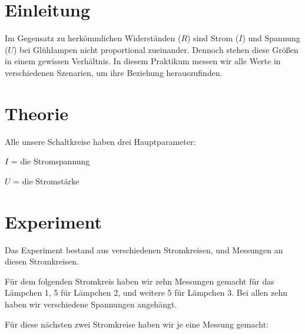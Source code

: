 \documentclass[12pt, a4paper, twoside]{article}
\begin{document}
\maketitlepage

\section{Einleitung}
Im Gegensatz zu herkömmlichen Widerständen ($R$) sind Strom ($I$) und Spannung ($U$) bei Glühlampen nicht proportional zueinander. Dennoch stehen diese Größen in einem gewissen Verhältnis.
In diesem Praktikum messen wir alle Werte in verschiedenen Szenarien, um ihre Beziehung herauszufinden.


\section{Theorie}
Alle unsere Schaltkreise haben drei Hauptparameter:
\begin{list}{-}{}
  \item $I$ = die Stromspannung
  \item $U$ = die Stromstärke
\end{list}

\section{Experiment}
Das Experiment bestand aus verschiedenen Stromkreisen, und Messungen an diesen Stromkreisen.
\par
Für dem folgenden Stromkreis haben wir zehn Messungen gemacht für das Lämpchen 1, 5 für Lämpchen 2, und weitere 5 für Lämpchen 3.
Bei allen zehn haben wir verschiedene Spannungen angehängt.\\



Für diese nächsten zwei Stromkreise haben wir je eine Messung gemacht:

\end{document}
